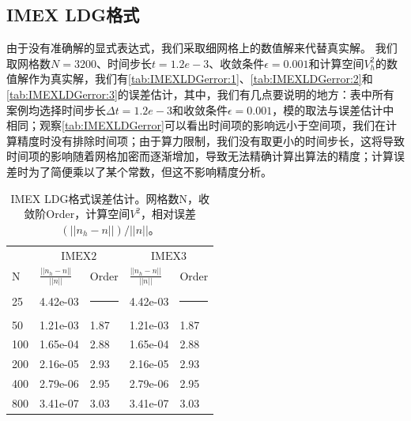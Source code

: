 \subsection{IMEX LDG格式}
由于没有准确解的显式表达式，我们采取细网格上的数值解来代替真实解。
我们取网格数$N=3200$、时间步长$t=1.2e-3$、收敛条件$\epsilon = 0.001$和计算空间$V_h^2$的数值解作为真实解，我们有\autoref{tab:IMEXLDGerror:1}、\autoref{tab:IMEXLDGerror:2}和\autoref{tab:IMEXLDGerror:3}的误差估计，其中，我们有几点要说明的地方：表中所有案例均选择时间步长$\Delta t = 1.2e-3$和收敛条件$\epsilon=0.001$，模的取法与误差估计中相同；观察\autoref{tab:IMEXLDGerror}可以看出时间项的影响远小于空间项，我们在计算精度时没有排除时间项；由于算力限制，我们没有取更小的时间步长，这将导致时间项的影响随着网格加密而逐渐增加，导致无法精确计算出算法的精度；计算误差时为了简便乘以了某个常数，但这不影响精度分析。
\begin{table}
	\begin{tabularx}{\textwidth}{@{} *5{X} @{}}
		\toprule
		    & \multicolumn{2}{c}{$\text{IMEX2}$} & \multicolumn{2}{c}{$\text{IMEX3}$}                                                  \\
		\cmidrule(lr){2-3} \cmidrule(lr){4-5}
		N   & $\frac{||n_h-n||}{||n||}$          & Order                              & $\frac{||n_h-n||}{||n||}$ & Order              \\
		\midrule
		25  & 4.42e-03                           & \rule{\len}{0.4pt}                 & 4.42e-03                  & \rule{\len}{0.4pt} \\
		50  & 1.21e-03                           & 1.87                               & 1.21e-03                  & 1.87               \\
		100 & 1.65e-04                           & 2.88                               & 1.65e-04                  & 2.88               \\
		200 & 2.16e-05                           & 2.93                               & 2.16e-05                  & 2.93               \\
		400 & 2.79e-06                           & 2.95                               & 2.79e-06                  & 2.95               \\
		800 & 3.41e-07                           & 3.03                               & 3.41e-07                  & 3.03               \\
		\bottomrule
	\end{tabularx}
	\caption{IMEX LDG格式误差估计。网格数N，收敛阶Order，计算空间$V^2$，相对误差$(||n_h-n||)/||n||$。}
	\label{tab:IMEXLDGerror}
\end{table}

